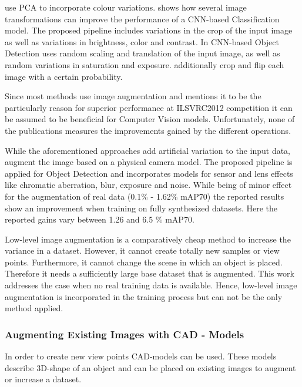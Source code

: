 \citeauthor{Krizhevsky2012a} \cite{Krizhevsky2012a} use \ac{PCA} to incorporate colour variations. \citeauthor{Howard2013} \cite{Howard2013} shows how several image transformations can improve the performance of a \ac{CNN}-based Classification model. The proposed pipeline includes variations in the crop of the input image as well as variations in brightness, color and contrast. In \ac{CNN}-based Object Detection \citeauthor{Redmon} \cite{Redmon} uses random scaling and translation of the input image, as well as random variations in saturation and exposure. \citeauthor{Liu} \cite{Liu} additionally crop and flip each image with a certain probability.

Since most methods use image augmentation and \citeauthor{Krizhevsky2012a} \cite{Krizhevsky2012a} mentions it to be the particularly reason for superior performance at ILSVRC2012 competition it can be assumed to be beneficial for Computer Vision models. Unfortunately, none of the publications measures the improvements gained by the different operations. 

While the aforementioned approaches add artificial variation to the input data, \citeauthor{Carlson2018}\cite{Carlson2018} augment the image based on a physical camera model. The proposed pipeline is applied for Object Detection and incorporates models for sensor and lens effects like chromatic aberration, blur, exposure and noise. While being of minor effect for the augmentation of real data (0.1\% - 1.62\% \ac{mAP}70) the reported results show an improvement when training on fully synthesized datasets. Here the reported gains vary between 1.26 and 6.5 \% \ac{mAP}70.

Low-level image augmentation is a comparatively cheap method to increase the variance in a dataset. However, it cannot create totally new samples or view points. Furthermore, it cannot change the scene in which an object is placed. Therefore it needs a sufficiently large base dataset that is augmented. This work addresses the case when no real training data is available. Hence, low-level image augmentation is incorporated in the training process but can not be the only method applied.

\subsubsection{Augmenting Existing Images with CAD - Models}

In order to create new view points \ac{CAD}-models can be used. These models describe 3D-shape of an object and can be placed on existing images to augment or increase a dataset.

